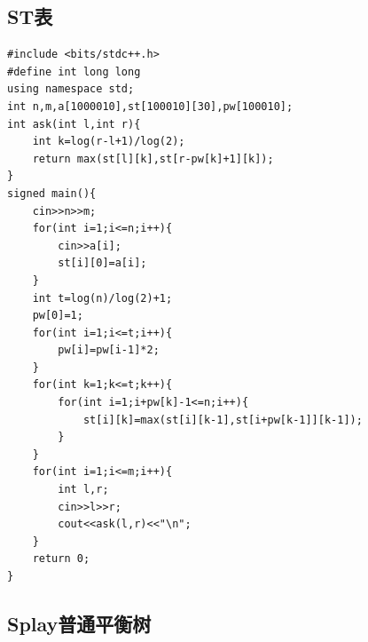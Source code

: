 \documentclass[11pt,a4paper]{ctexart}
\begin{document}
\subsection{ST表}

\begin{lstlisting}
#include <bits/stdc++.h>
#define int long long
using namespace std;
int n,m,a[1000010],st[100010][30],pw[100010];
int ask(int l,int r){
	int k=log(r-l+1)/log(2);
	return max(st[l][k],st[r-pw[k]+1][k]);
}
signed main(){
    cin>>n>>m;
    for(int i=1;i<=n;i++){
    	cin>>a[i];
    	st[i][0]=a[i];
	}
	int t=log(n)/log(2)+1;
	pw[0]=1;
	for(int i=1;i<=t;i++){
		pw[i]=pw[i-1]*2;
	}
	for(int k=1;k<=t;k++){
		for(int i=1;i+pw[k]-1<=n;i++){
			st[i][k]=max(st[i][k-1],st[i+pw[k-1]][k-1]);
		}
	}
	for(int i=1;i<=m;i++){
		int l,r;
		cin>>l>>r;
		cout<<ask(l,r)<<"\n";
	}
	return 0;
}
\end{lstlisting}

\subsection{Splay普通平衡树}
\end{document}
